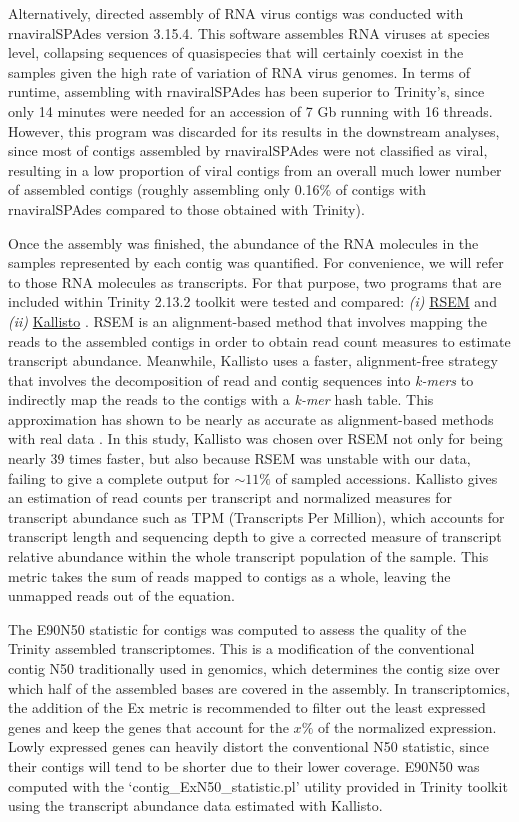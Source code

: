 \documentclass[
  openany]{book}
\begin{document}
Alternatively, directed assembly of RNA virus contigs was conducted with rnaviralSPAdes version 3.15.4. This software assembles RNA viruses at species level, collapsing sequences of quasispecies that will certainly coexist in the samples given the high rate of variation of RNA virus genomes. In terms of runtime, assembling with rnaviralSPAdes has been superior to Trinity's, since only 14 minutes were needed for an accession of 7 Gb running with 16 threads. However, this program was discarded for its results in the downstream analyses, since most of contigs assembled by rnaviralSPAdes were not classified as viral, resulting in a low proportion of viral contigs from an overall much lower number of assembled contigs (roughly assembling only 0.16\% of contigs with rnaviralSPAdes compared to those obtained with Trinity).

Once the assembly was finished, the abundance of the RNA molecules in the samples represented by each contig was quantified. For convenience, we will refer to those RNA molecules as transcripts. For that purpose, two programs that are included within Trinity 2.13.2 toolkit were tested and compared: \emph{(i)} \href{https://github.com/deweylab/RSEM}{RSEM} \autocite{Li2011} and \emph{(ii)} \href{https://github.com/pachterlab/kallisto}{Kallisto} \autocite{Bray2016}. RSEM is an alignment-based method that involves mapping the reads to the assembled contigs in order to obtain read count measures to estimate transcript abundance. Meanwhile, Kallisto uses a faster, alignment-free strategy that involves the decomposition of read and contig sequences into \emph{k-mers} to indirectly map the reads to the contigs with a \emph{k-mer} hash table. This approximation has shown to be nearly as accurate as alignment-based methods with real data \autocite{Sarantopoulou2021}. In this study, Kallisto was chosen over RSEM not only for being nearly 39 times faster, but also because RSEM was unstable with our data, failing to give a complete output for \(\sim 11 \%\) of sampled accessions. Kallisto gives an estimation of read counts per transcript and normalized measures for transcript abundance such as TPM (Transcripts Per Million), which accounts for transcript length and sequencing depth to give a corrected measure of transcript relative abundance within the whole transcript population of the sample. This metric takes the sum of reads mapped to contigs as a whole, leaving the unmapped reads out of the equation.

The E90N50 statistic for contigs was computed to assess the quality of the Trinity assembled transcriptomes. This is a modification of the conventional contig N50 traditionally used in genomics, which determines the contig size over which half of the assembled bases are covered in the assembly. In transcriptomics, the addition of the Ex metric is recommended to filter out the least expressed genes and keep the genes that account for the \(x\%\) of the normalized expression. Lowly expressed genes can heavily distort the conventional N50 statistic, since their contigs will tend to be shorter due to their lower coverage. E90N50 was computed with the `contig\_ExN50\_statistic.pl' utility provided in Trinity toolkit using the transcript abundance data estimated with Kallisto.
\end{document}

